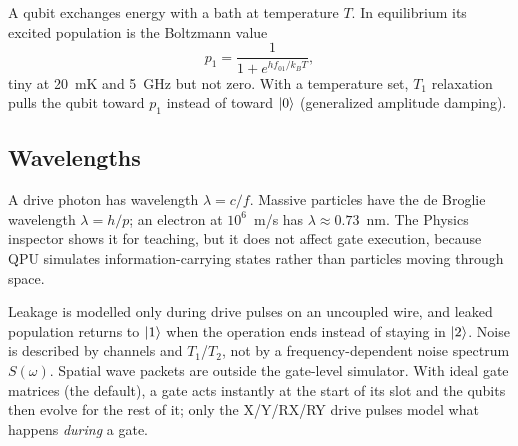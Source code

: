 A qubit exchanges energy with a bath at temperature $T$. In equilibrium its
excited population is the Boltzmann value
\[
p_1=\frac{1}{1+e^{hf_{01}/k_BT}},
\]
tiny at 20~mK and 5~GHz but not zero. With a temperature set, $T_1$
relaxation pulls the qubit toward $p_1$ instead of toward $\lvert 0\rangle$
(generalized amplitude damping).

\subsection{Wavelengths}

A drive photon has wavelength $\lambda=c/f$. Massive particles have the de
Broglie wavelength $\lambda=h/p$; an electron at $10^6$~m/s has
$\lambda\approx0.73$~nm. The Physics inspector shows it for teaching, but it
does not affect gate execution, because QPU simulates information-carrying
states rather than particles moving through space.

\begin{cautionbox}
Leakage is modelled only during drive pulses on an uncoupled wire, and leaked
population returns to $\lvert 1\rangle$ when the operation ends instead of staying in
$\lvert 2\rangle$. Noise is described by channels and
$T_1$/$T_2$, not by a frequency-dependent noise spectrum $S(\omega)$. Spatial
wave packets are outside the gate-level simulator. With ideal gate matrices
(the default), a gate acts instantly at the start of its slot and the qubits
then evolve for the rest of it; only the X/Y/RX/RY drive pulses model what
happens \emph{during} a gate.
\end{cautionbox}
